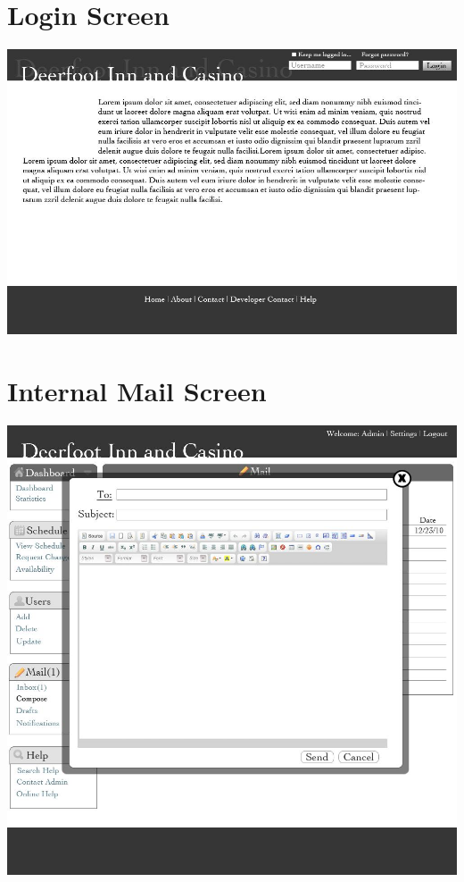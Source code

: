 \documentclass[letterpaper,12pt]{report}
\begin{document}
\begin{landscape}
\section{Login Screen}
\begin{center}
 \includegraphics[scale=0.4]{prototypes/p2LoginScreen.jpeg}
\end{center}

\section{Internal Mail Screen}
\begin{center}
 \includegraphics[scale=0.3]{prototypes/p2mailScreen.jpeg}
\end{center}


\end{landscape}
\end{document}
